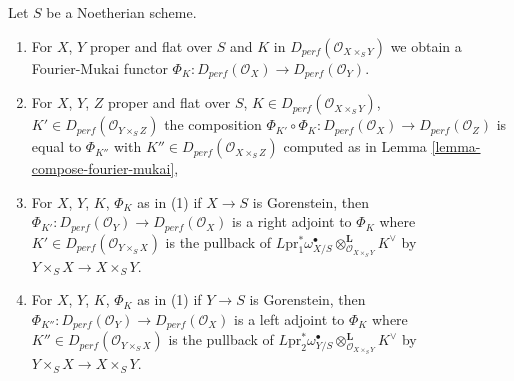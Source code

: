 \begin{lemma}
\label{lemma-fourier-mukai-flat-proper-over-noetherian}
Let $S$ be a Noetherian scheme.
\begin{enumerate}
\item For $X$, $Y$ proper and flat over $S$ and $K$ in
$D_{perf}(\mathcal{O}_{X \times_S Y})$ we obtain a Fourier-Mukai functor
$\Phi_K : D_{perf}(\mathcal{O}_X) \to D_{perf}(\mathcal{O}_Y)$.
\item For $X$, $Y$, $Z$ proper and flat over $S$, $K \in
D_{perf}(\mathcal{O}_{X \times_S Y})$, $K' \in
D_{perf}(\mathcal{O}_{Y \times_S Z})$ the composition
$\Phi_{K'} \circ \Phi_K : D_{perf}(\mathcal{O}_X) \to D_{perf}(\mathcal{O}_Z)$
is equal to $\Phi_{K''}$ with $K'' \in D_{perf}(\mathcal{O}_{X \times_S Z})$
computed as in Lemma \ref{lemma-compose-fourier-mukai},
\item For $X$, $Y$, $K$, $\Phi_K$ as in (1) if $X \to S$ is Gorenstein, then
$\Phi_{K'} : D_{perf}(\mathcal{O}_Y) \to D_{perf}(\mathcal{O}_X)$ is a right
adjoint to $\Phi_K$ where $K' \in D_{perf}(\mathcal{O}_{Y \times_S X})$
is the pullback of $L\text{pr}_1^*\omega_{X/S}^\bullet
\otimes_{\mathcal{O}_{X \times_S Y}}^\mathbf{L} K^\vee$ by
$Y \times_S X \to X \times_S Y$.
\item For $X$, $Y$, $K$, $\Phi_K$ as in (1) if $Y \to S$ is Gorenstein, then
$\Phi_{K''} : D_{perf}(\mathcal{O}_Y) \to D_{perf}(\mathcal{O}_X)$ is a left
adjoint to $\Phi_K$ where $K'' \in D_{perf}(\mathcal{O}_{Y \times_S X})$
is the pullback of $L\text{pr}_2^*\omega_{Y/S}^\bullet
\otimes_{\mathcal{O}_{X \times_S Y}}^\mathbf{L} K^\vee$ by
$Y \times_S X \to X \times_S Y$.
\end{enumerate}
\end{lemma}

